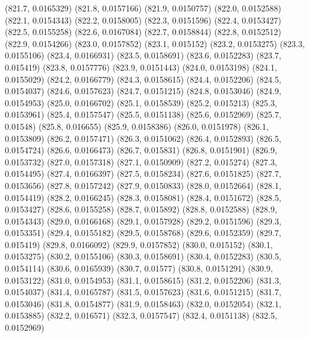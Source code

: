 {					(821.7, 0.0165329)
					(821.8, 0.0157166)
					(821.9, 0.0150757)
					(822.0, 0.0152588)
					(822.1, 0.0154343)
					(822.2, 0.0158005)
					(822.3, 0.0151596)
					(822.4, 0.0153427)
					(822.5, 0.0155258)
					(822.6, 0.0167084)
					(822.7, 0.0158844)
					(822.8, 0.0152512)
					(822.9, 0.0154266)
					(823.0, 0.0157852)
					(823.1, 0.015152)
					(823.2, 0.0153275)
					(823.3, 0.0155106)
					(823.4, 0.0166931)
					(823.5, 0.0158691)
					(823.6, 0.0152283)
					(823.7, 0.015419)
					(823.8, 0.0157776)
					(823.9, 0.0151443)
					(824.0, 0.0153198)
					(824.1, 0.0155029)
					(824.2, 0.0166779)
					(824.3, 0.0158615)
					(824.4, 0.0152206)
					(824.5, 0.0154037)
					(824.6, 0.0157623)
					(824.7, 0.0151215)
					(824.8, 0.0153046)
					(824.9, 0.0154953)
					(825.0, 0.0166702)
					(825.1, 0.0158539)
					(825.2, 0.015213)
					(825.3, 0.0153961)
					(825.4, 0.0157547)
					(825.5, 0.0151138)
					(825.6, 0.0152969)
					(825.7, 0.01548)
					(825.8, 0.016655)
					(825.9, 0.0158386)
					(826.0, 0.0151978)
					(826.1, 0.0153809)
					(826.2, 0.0157471)
					(826.3, 0.0151062)
					(826.4, 0.0152893)
					(826.5, 0.0154724)
					(826.6, 0.0166473)
					(826.7, 0.015831)
					(826.8, 0.0151901)
					(826.9, 0.0153732)
					(827.0, 0.0157318)
					(827.1, 0.0150909)
					(827.2, 0.015274)
					(827.3, 0.0154495)
					(827.4, 0.0166397)
					(827.5, 0.0158234)
					(827.6, 0.0151825)
					(827.7, 0.0153656)
					(827.8, 0.0157242)
					(827.9, 0.0150833)
					(828.0, 0.0152664)
					(828.1, 0.0154419)
					(828.2, 0.0166245)
					(828.3, 0.0158081)
					(828.4, 0.0151672)
					(828.5, 0.0153427)
					(828.6, 0.0155258)
					(828.7, 0.015892)
					(828.8, 0.0152588)
					(828.9, 0.0154343)
					(829.0, 0.0166168)
					(829.1, 0.0157928)
					(829.2, 0.0151596)
					(829.3, 0.0153351)
					(829.4, 0.0155182)
					(829.5, 0.0158768)
					(829.6, 0.0152359)
					(829.7, 0.015419)
					(829.8, 0.0166092)
					(829.9, 0.0157852)
					(830.0, 0.015152)
					(830.1, 0.0153275)
					(830.2, 0.0155106)
					(830.3, 0.0158691)
					(830.4, 0.0152283)
					(830.5, 0.0154114)
					(830.6, 0.0165939)
					(830.7, 0.01577)
					(830.8, 0.0151291)
					(830.9, 0.0153122)
					(831.0, 0.0154953)
					(831.1, 0.0158615)
					(831.2, 0.0152206)
					(831.3, 0.0154037)
					(831.4, 0.0165787)
					(831.5, 0.0157623)
					(831.6, 0.0151215)
					(831.7, 0.0153046)
					(831.8, 0.0154877)
					(831.9, 0.0158463)
					(832.0, 0.0152054)
					(832.1, 0.0153885)
					(832.2, 0.016571)
					(832.3, 0.0157547)
					(832.4, 0.0151138)
					(832.5, 0.0152969)
}
